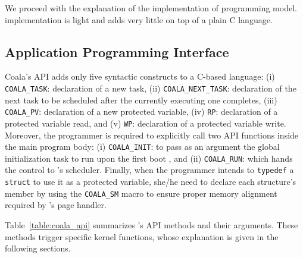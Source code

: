 We proceed with the explanation of the implementation of \sys programming model. \sys implementation is light and adds very little on top of a plain C language.

\subsection{\sys Application Programming Interface}
\label{sec:coala_api}

Coala's API adds only five syntactic constructs to a C-based language: (i) \texttt{COALA\_TASK}: declaration of a new task, (ii) \texttt{COALA\_NEXT\_TASK}: declaration of the next task to be scheduled after the currently executing one completes, (iii) \texttt{COALA\_PV}: declaration of a new protected variable, (iv) \texttt{RP}: declaration of a protected variable read, and (v) \texttt{WP}: declaration of a protected variable write. Moreover, the programmer is required to explicitly call two \sys API functions inside the main program body: (i) \texttt{COALA\_INIT}: to pass as an argument the global initialization task to run upon the first boot , and (ii) \texttt{COALA\_RUN}: which hands the control to \sys's scheduler. Finally, when the programmer intends to \texttt{typedef} a \texttt{struct} to use it as a protected variable, she/he need to declare each structure's member by using the \texttt{COALA\_SM} macro to ensure proper memory alignment required by \sys's page handler.

Table~\ref{table:coala_api} summarizes \sys's API methods and their arguments.  These methods trigger specific \sys kernel functions, whose explanation is given in the following sections.

